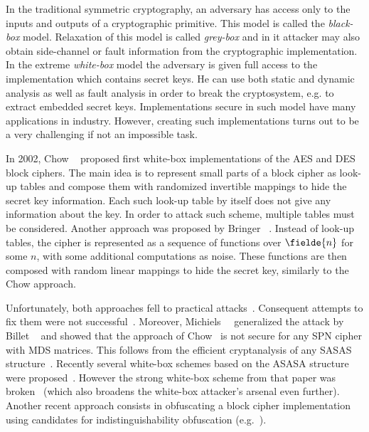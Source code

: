 
In the traditional symmetric cryptography, an adversary has access only to the inputs and outputs of a cryptographic primitive. This model is called the \emph{black-box} model. Relaxation of this model is called \emph{grey-box} and in it attacker may also obtain side-channel or fault information from the cryptographic implementation.  
In the extreme \emph{white-box} model the adversary is given full access to the implementation which contains secret keys. He can use both static and dynamic analysis as well as fault analysis in order to break the cryptosystem, e.g. to extract embedded secret keys. Implementations secure in such model have many applications in industry. However, creating such implementations turns out to be a very challenging if not an impossible task.

In 2002, Chow \etal{}~\cite{ChowAES,ChowDES} proposed first white-box implementations of the AES and DES block ciphers. The main idea is to represent small parts of a block cipher as look-up tables and compose them with randomized invertible mappings to hide the secret key information. Each such look-up table by itself does not give any information about the key. In order to attack such scheme, multiple tables must be considered. Another approach was proposed by Bringer \etal{}~\cite{cryptoeprint:2006:468}. Instead of look-up tables, the cipher is represented as a sequence of functions over $\fielde{n}$ for some $n$, with some additional computations as noise. These functions are then composed with random linear mappings to hide the secret key, similarly to the Chow \etal{} approach.

Unfortunately, both approaches fell to practical attacks~\cite{AttackBillet,AttackMulder,AttackLepoint}. Consequent attempts to fix them were not successful~\cite{Dual,Xiao}. Moreover, Michiels~\etal{}~\cite{AttackMichiels} generalized the attack by Billet \etal{}~\cite{AttackBillet} and showed that the approach of Chow~\etal{} is not secure for any SPN cipher with MDS matrices. This follows from the efficient cryptanalysis of any SASAS structure~\cite{SASAS}. Recently several white-box schemes based on the ASASA structure were proposed~\cite{ASASAdesign}. However the strong white-box scheme from that paper was broken~\cite{ASASA2,GPT15,BKP17} (which also broadens the white-box attacker's arsenal even further). Another recent approach consists in obfuscating a block cipher implementation using candidates for indistinguishability obfuscation (e.g.~\cite{iOcand}).

